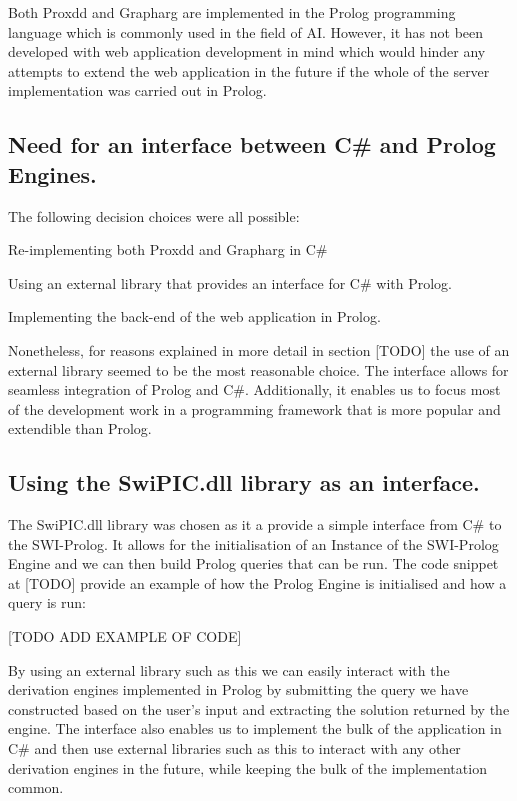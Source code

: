 Both Proxdd and Grapharg are implemented in the Prolog programming language which is commonly used in the field of AI. However, it has not been developed with web application development in mind which would hinder any attempts to extend the web application in the future if the whole of the server implementation was carried out in Prolog. 

\subsection{Need for an interface between C\# and Prolog Engines.}

The following decision choices were all possible:

\begin{itemize*}
\item Re-implementing both Proxdd and Grapharg in C\#
\item Using an external library that provides an interface for C\# with Prolog.
\item Implementing the back-end of the web application in Prolog.
\end{itemize*}

Nonetheless, for reasons explained in more detail in section [TODO] the use of an external library seemed to be the most reasonable choice. The interface allows for seamless integration of Prolog and C\#. Additionally, it enables us to focus most of the development work in a programming framework that is more popular and extendible than Prolog.

\subsection{Using the SwiPIC.dll library as an interface.}

The SwiPIC.dll library was chosen as it a provide a simple interface from C\# to the SWI-Prolog. It allows for the initialisation of an Instance of the SWI-Prolog Engine and we can then build Prolog queries that can be run. The code snippet at [TODO] provide an example of how the Prolog Engine is initialised and how a query is run:

[TODO ADD EXAMPLE OF CODE]

By using an external library such as this we can easily interact with the derivation engines implemented in Prolog by submitting the query we have constructed based on the user's input and extracting the solution returned by the engine. The interface also enables us to implement the bulk of the application in C\# and then use external libraries such as this to interact with any other derivation engines in the future, while keeping the bulk of the implementation common.

